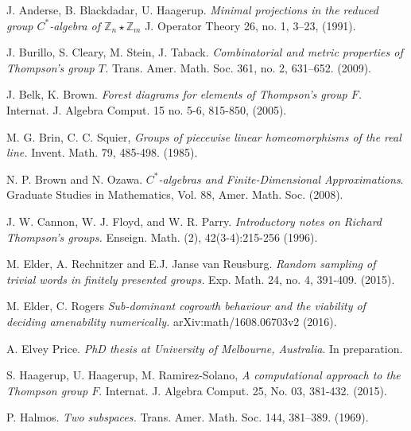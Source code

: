 \documentclass{amsart}
\newcommand{\Z}{\mathbb Z}
\theoremstyle{definition}
\begin{document}
$ $\newpage
\begin{thebibliography}{99}






J. Anderse, B. Blackdadar, U. Haagerup.
\emph{Minimal projections in the reduced group $C^*$-algebra of $\Z_n\star\Z_m$}
J. Operator Theory 26, no. 1, 3–23,
(1991).

J. Burillo, S. Cleary, M. Stein, J. Taback.
\emph{Combinatorial and metric properties of Thompson's group $T$.} 
Trans. Amer. Math. Soc. 361, no. 2, 631–652. 
(2009).



  J. Belk, K. Brown.
  \emph{Forest diagrams for elements of Thompson's group $F$.}
   Internat. J. Algebra Comput. 15 no. 5-6, 815-850,
  (2005).



M. G. Brin, C. C. Squier,
\emph{Groups of piecewise linear homeomorphisms of the real line.}
Invent. Math. 79, 485-498.
(1985).

N. P. Brown and N. Ozawa.
\emph{$C^*$-algebras and Finite-Dimensional Approximations}.
Graduate Studies in Mathematics, Vol. 88, Amer. Math. Soc.
(2008).



J. W. Cannon, W. J. Floyd, and W. R. Parry.
\emph{Introductory notes on Richard Thompson's groups.}
Enseign. Math. (2), 42(3-4):215-256
(1996).


M. Elder, A. Rechnitzer and E.J. Janse van Reusburg.
\emph{ Random sampling of trivial words in finitely presented groups.}
Exp. Math. 24, no. 4, 391-409. 
(2015).


M. Elder, C. Rogers
\emph{ Sub-dominant cogrowth behaviour and the viability of deciding amenability numerically.}
arXiv:math/1608.06703v2
(2016).

A. Elvey Price.
\emph{PhD thesis at University of Melbourne, Australia}.
In preparation.



S. Haagerup, U. Haagerup, M. Ramirez-Solano, 
\emph{A computational approach to the Thompson group $F.$}
Internat. J. Algebra Comput. 25, No. 03,  381-432.
(2015).

P. Halmos.
\emph{Two subspaces.}
Trans. Amer. Math. Soc. 144,  381–389.
(1969).


\end{thebibliography}
\end{document}
